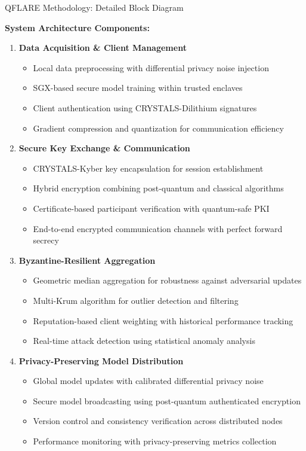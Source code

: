 \documentclass[aspectratio=169,11pt]{beamer}
\begin{document}
\begin{frame}{QFLARE Methodology: Detailed Block Diagram}

\textbf{System Architecture Components:}

\begin{enumerate}
\item \textbf{Data Acquisition \& Client Management}
   \begin{itemize}
   \item Local data preprocessing with differential privacy noise injection
   \item SGX-based secure model training within trusted enclaves
   \item Client authentication using CRYSTALS-Dilithium signatures
   \item Gradient compression and quantization for communication efficiency
   \end{itemize}

\item \textbf{Secure Key Exchange \& Communication}
   \begin{itemize}
   \item CRYSTALS-Kyber key encapsulation for session establishment
   \item Hybrid encryption combining post-quantum and classical algorithms
   \item Certificate-based participant verification with quantum-safe PKI
   \item End-to-end encrypted communication channels with perfect forward secrecy
   \end{itemize}

\item \textbf{Byzantine-Resilient Aggregation}
   \begin{itemize}
   \item Geometric median aggregation for robustness against adversarial updates
   \item Multi-Krum algorithm for outlier detection and filtering
   \item Reputation-based client weighting with historical performance tracking
   \item Real-time attack detection using statistical anomaly analysis
   \end{itemize}

\item \textbf{Privacy-Preserving Model Distribution}
   \begin{itemize}
   \item Global model updates with calibrated differential privacy noise
   \item Secure model broadcasting using post-quantum authenticated encryption
   \item Version control and consistency verification across distributed nodes
   \item Performance monitoring with privacy-preserving metrics collection
   \end{itemize}
\end{enumerate}


\end{frame}
\end{document}
